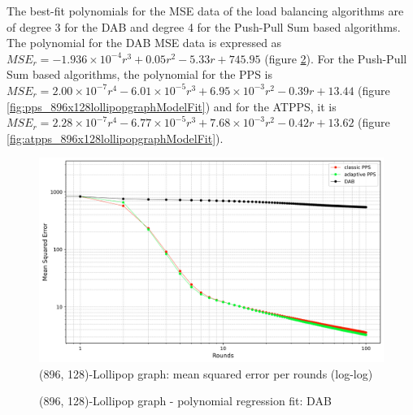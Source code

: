 The best-fit polynomials for the MSE data of the load balancing algorithms are of degree 3 for the DAB and degree 4 for the Push-Pull Sum based algorithms. The polynomial for the DAB MSE data is expressed as $MSE_r=-1.936\times 10^{-4}r^{3}+0.05r^{2}-5.33r+745.95$ (figure \ref{fig:dab_896x128lollipopgraphModelFit}). For the Push-Pull Sum based algorithms, the polynomial for the PPS is $MSE_r=2.00\times 10^{-7}r^{4}-6.01\times 10^{-5}r^{3}+6.95\times 10^{-3}r^{2}-0.39r+13.44$ (figure \ref{fig:pps_896x128lollipopgraphModelFit}) and for the ATPPS, it is $MSE_r=2.28\times 10^{-7}r^{4}-6.77\times 10^{-5}r^{3}+7.68\times 10^{-3}r^{2}-0.42r+13.62$ (figure \ref{fig:atpps_896x128lollipopgraphModelFit}).
\begin{figure}[]
    \centering
    \includegraphics[width=\linewidth]{figures/Simulation_outcomes/LollipopGraph/896_128/DAB_vs_PPS_LG_r100_n1024_averaged_loglog.png}
    \caption{(896, 128)-Lollipop graph: mean squared error per rounds (log-log)}
    \label{fig:896_128lollipopgraphMSEperRoundLogLog}
\end{figure}

\begin{figure}[]
    \centering
    \caption{(896, 128)-Lollipop graph - polynomial regression fit: DAB}
    \label{fig:dab_896x128lollipopgraphModelFit}
\end{figure}

